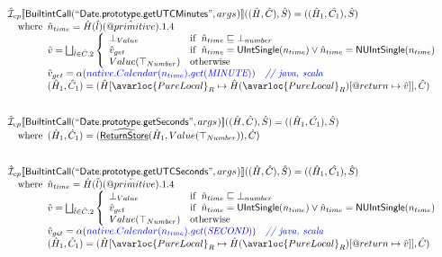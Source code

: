 \[\begin{array}{l}
\aI _{cp}\lbr \SF{BuiltintCall}(``\SF{Date.prototype.getUTCMinutes}",args_{})\rbr((\hat{H},\hat{C}), \hat{S})
  = ((\hat{H}_1, \hat{C_1}), \hat{S})\\
\quad\wherec{
  \hat{n}_{time} = \hat{H}(\hat{l})(\avarprop{primitive}).1.4\\
  \hat{v} = \bigsqcup_{\hat{l} \in \hat{C}.2} \left\{\begin{array}{ll}
      \bot_{Value} & \ifc{\hat{n}_{time} \sqsubseteq  \bot_{number}}\\
      \hat{v}_{get} &
      \ifc{\hat{n}_{time} = \SF{UIntSingle}(n_{time}) \lor\hat{n}_{time} = \SF{NUIntSingle}(n_{time}) }\\
      Value(\top_{Number}) & \owc
    \end{array}\right.\\
  \hat{v}_{get} = \alpha({\inblue native.Calendar(n_{time}).get(\emph{MINUTE})})
    \quad\comment{{\inblue // java, scala}}\\  
  (\hat{H}_1, \hat{C}_1) = 
    (\hat{H}[\avarloc{PureLocal}_R \mapsto \hat{H}(\avarloc{PureLocal}_R)
      [\varprop{return} \mapsto \hat{v}]], \hat{C})\\
  }\\
\\\\

\aI _{cp}\lbr \SF{BuiltintCall}(``\SF{Date.prototype.getSeconds}",args_{})\rbr((\hat{H},\hat{C}), \hat{S})
  = ((\hat{H}_1, \hat{C_1}), \hat{S})\\
\quad\wherec{
  (\hat{H}_1, \hat{C}_1) = (\ahf{ReturnStore}(\hat{H}_1, Value(\top_{Number})), \hat{C})
  }\\
\\\\

\aI _{cp}\lbr \SF{BuiltintCall}(``\SF{Date.prototype.getUTCSeconds}",args_{})\rbr((\hat{H},\hat{C}), \hat{S})
  = ((\hat{H}_1, \hat{C_1}), \hat{S})\\
\quad\wherec{
  \hat{n}_{time} = \hat{H}(\hat{l})(\avarprop{primitive}).1.4\\
  \hat{v} = \bigsqcup_{\hat{l} \in \hat{C}.2} \left\{\begin{array}{ll}
      \bot_{Value} & \ifc{\hat{n}_{time} \sqsubseteq  \bot_{number}}\\
      \hat{v}_{get} &
      \ifc{\hat{n}_{time} = \SF{UIntSingle}(n_{time}) \lor\hat{n}_{time} = \SF{NUIntSingle}(n_{time}) }\\
      Value(\top_{Number}) & \owc
    \end{array}\right.\\
  \hat{v}_{get} = \alpha({\inblue native.Calendar(n_{time}).get(\emph{SECOND})})
    \quad\comment{{\inblue // java, scala}}\\  
  (\hat{H}_1, \hat{C}_1) = 
    (\hat{H}[\avarloc{PureLocal}_R \mapsto \hat{H}(\avarloc{PureLocal}_R)
      [\varprop{return} \mapsto \hat{v}]], \hat{C})\\
  }\\
\\\\


\end{array}
\]
